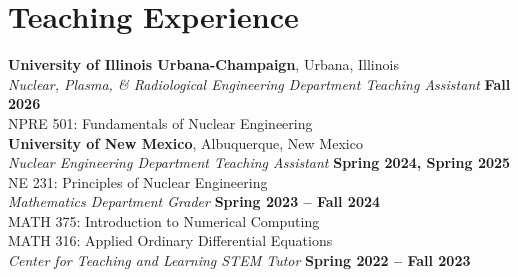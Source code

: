 \section{\mysidestyle Teaching Experience}

\textbf{University of Illinois Urbana-Champaign}, Urbana, Illinois\\
\textsl{Nuclear, Plasma, \& Radiological Engineering Department Teaching Assistant} \hfill \textbf{Fall 2026}\\
\hspace*{2 mm} NPRE 501: Fundamentals of Nuclear Engineering \vspace{2 mm}\\
\textbf{University of New Mexico}, Albuquerque, New Mexico\\
\textsl{Nuclear Engineering Department Teaching Assistant} \hfill \textbf{Spring 2024, Spring 2025}\\
\hspace*{2 mm} NE 231: Principles of Nuclear Engineering \vspace{2 mm}\\
\textsl{Mathematics Department Grader} \hfill \textbf{Spring 2023 -- Fall 2024} \\
\hspace*{2 mm} MATH 375: Introduction to Numerical Computing\\
\hspace*{2 mm} MATH 316: Applied Ordinary Differential Equations \vspace{2 mm}\\
\textsl{Center for Teaching and Learning STEM Tutor} \hfill \textbf{Spring 2022 -- Fall 2023} \vspace{2 mm}\\
